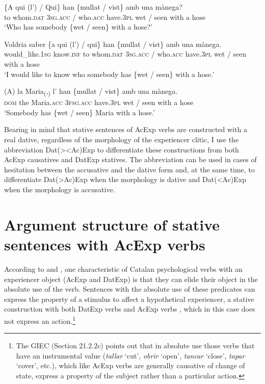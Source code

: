 \documentclass[output=paper,colorlinks,citecolor=brown,modfonts,nonflat]{langsci/langscibook}
\begin{document}
{{ \ex \label{ex:royo:17c}
 \gll \{A qui (l’) / Qui\} han \{mullat / vist\} amb una mànega?\\
 to whom.\textsc{dat} \textsc{3sg.acc} / who.\textsc{acc} have.\textsc{3pl} wet / seen with a hose\\
\glt ‘Who has somebody \{wet / seen\} with a hose?’
 
 \ex \label{ex:royo:17d}
 \gll Voldria saber \{a qui (l’) / qui\} han \{mullat / vist\} amb una mànega.\\
 would\_like.\textsc{1sg} know.\textsc{inf} to whom.\textsc{dat} \textsc{3sg.acc} / who.\textsc{acc} have.\textsc{3pl} wet / seen with a hose\\
\glt ‘I would like to know who somebody has \{wet / seen\} with a hose.’
 
 \ex \label{ex:royo:17e}
 \gll (A) la Maria\textsubscript{(},\textsubscript{)} l’ han \{mullat / vist\} amb una mànega.\\
 \textsc{dom} the Maria.\textsc{acc} \textsc{3fsg.acc} have.\textsc{3pl} wet / seen with a hose\\
\glt ‘Somebody has \{wet / seen\} Maria with a hose.’
 
 \z
 \z 

Bearing in mind that stative sentences of AcExp verbs are constructed with a real dative, regardless of the morphology of the experiencer clitic, I use the abbreviation Dat(>{\textbar}<Ac)Exp to differentiate these constructions from both AcExp causatives and DatExp statives. The abbreviation can be used in cases of hesitation between the accusative and the dative form and, at the same time, to differentiate Dat(>Ac)Exp when the morphology is dative and Dat(<Ac)Exp when the morphology is accusative.

\section{Argument structure of stative sentences with AcExp verbs}\label{sec:royo:5}

According to \citet[Sections 13.3.6.2a-b and 13.3.7.2b]{Rossello2008} and \citet[21.2.2b and 21.5a]{GIEC2016}, one characteristic of Catalan psychological verbs with an experiencer object (AcExp and DatExp) is that they can elide their object in the absolute use of the verb. Sentences with the absolute use of these predicates can express the property of a stimulus to affect a hypothetical experiencer, a stative construction with both DatExp verbs  and AcExp verbs , which in this case does not express an action.\footnote{The GIEC (Section 21.2.2c) points out that in absolute use those verbs that have an instrumental value (\textit{tallar} ‘cut’, \textit{obrir} ‘open’, \textit{tancar} ‘close’, \textit{tapar} ‘cover’, etc.), which like AcExp verbs are generally causative of change of state, express a property of the subject rather than a particular action.}

}}
\end{document}
